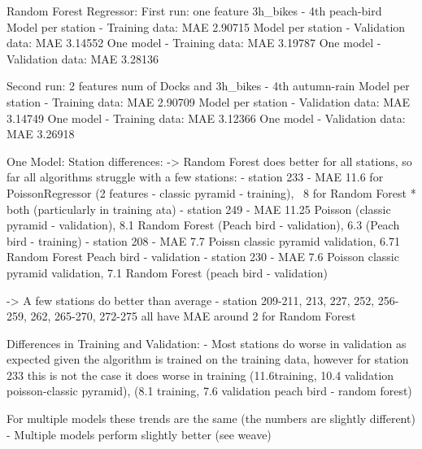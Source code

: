 \documentclass{article}
\begin{document}
{{{{{{{                        Random Forest Regressor:
                        First run: one feature 3h\_bikes - 4th peach-bird
                        Model per station - Training data: MAE 2.90715
                        Model per station - Validation data: MAE 3.14552
                        One model - Training data: MAE 3.19787
                        One model - Validation data: MAE 3.28136

                        Second run: 2 features num of Docks and 3h\_bikes - 4th autumn-rain
                        Model per station - Training data: MAE 2.90709
                        Model per station - Validation data: MAE 3.14749
                        One model - Training data: MAE 3.12366
                        One model - Validation data: MAE 3.26918

                        One Model:
                        Station differences:
                        -> Random Forest does better for all stations, so far all algorithms struggle with a few stations:
                        - station 233 - MAE 11.6 for PoissonRegressor (2 features - classic pyramid - training), ~8 for Random Forest * both (particularly in training ata)
                            - station 249 - MAE 11.25 Poisson (classic pyramid - validation), 8.1 Random Forest (Peach bird - validation),
                            6.3 (Peach bird - training)
                            - station 208 - MAE 7.7 Poissn classic pyramid validation, 6.71 Random Forest Peach bird - validation
                            - station 230 - MAE 7.6 Poisson classic pyramid validation, 7.1 Random Forest (peach bird - validation)

                            -> A few stations do better than average
                            - station 209-211, 213, 227, 252, 256-259, 262, 265-270, 272-275 all have MAE around 2 for Random Forest

                            Differences in Training and Validation:
                            - Most stations do worse in validation as expected given the algorithm is trained on the training data, however for station
                            233 this is not the case it does worse in training (11.6training, 10.4 validation poisson-classic pyramid),
                            (8.1 training, 7.6 validation peach bird -  random forest)

                            For multiple models these trends are the same (the numbers are slightly different)
                            - Multiple models perform slightly better (see weave)

}}}}}}}
\end{document}
